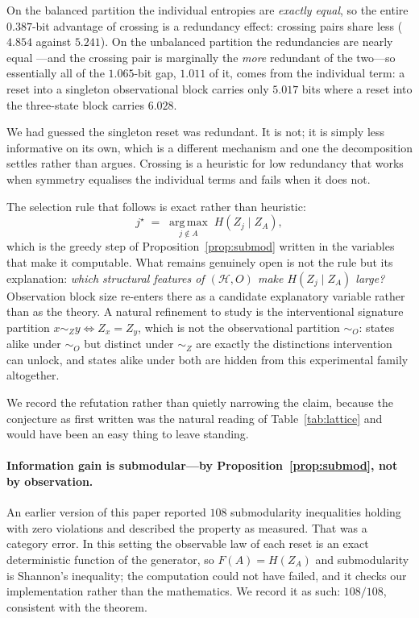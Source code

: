\documentclass[11pt]{article}
\newcommand{\HH}{\ensuremath{\mathcal{H}}}
\begin{document}
On the balanced partition the individual entropies are \emph{exactly equal}, so the entire
$0.387$-bit advantage of crossing is a redundancy effect: crossing pairs share less
($4.854$ against $5.241$). On the unbalanced partition the redundancies are nearly equal
---and the crossing pair is marginally the \emph{more} redundant of the two---so
essentially all of the $1.065$-bit gap, $1.011$ of it, comes from the individual term: a
reset into a singleton observational block carries only $5.017$ bits where a reset into the
three-state block carries $6.028$.

We had guessed the singleton reset was redundant. It is not; it is simply less informative
on its own, which is a different mechanism and one the decomposition settles rather than
argues. Crossing is a heuristic for low redundancy that works when symmetry equalises the
individual terms and fails when it does not.

The selection rule that follows is exact rather than heuristic:
\[
  j^\star \;=\; \operatorname*{arg\,max}_{j \notin A}\; H(Z_j \mid Z_A),
\]
which is the greedy step of Proposition~\ref{prop:submod} written in the variables that
make it computable. What remains genuinely open is not the rule but its explanation:
\emph{which structural features of $(\HH, O)$ make $H(Z_j \mid Z_A)$ large?} Observation
block size re-enters there as a candidate explanatory variable rather than as the theory.
A natural refinement to study is the interventional signature partition
$x \sim_Z y \iff Z_x = Z_y$, which is not the observational partition $\sim_O$: states
alike under $\sim_O$ but distinct under $\sim_Z$ are exactly the distinctions intervention
can unlock, and states alike under both are hidden from this experimental family
altogether.

We record the refutation rather than quietly narrowing the claim, because the conjecture as
first written was the natural reading of Table~\ref{tab:lattice} and would have been an
easy thing to leave standing.

\paragraph{Information gain is submodular---by Proposition~\ref{prop:submod}, not by
observation.}
An earlier version of this paper reported $108$ submodularity inequalities holding with
zero violations and described the property as measured. That was a category error. In this
setting the observable law of each reset is an exact deterministic function of the
generator, so $F(A) = H(Z_A)$ and submodularity is Shannon's inequality; the computation
could not have failed, and it checks our implementation rather than the mathematics. We
record it as such: $108/108$, consistent with the theorem.
\end{document}
